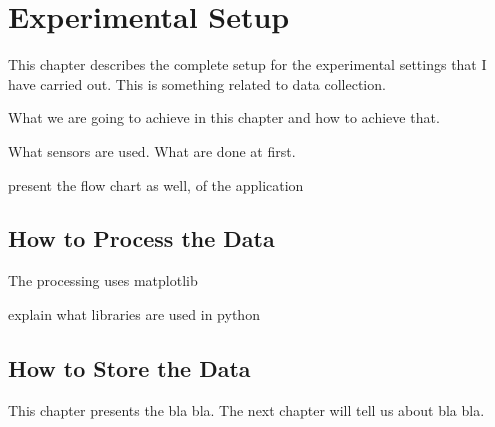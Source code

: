 \chapter{Experimental Setup}
\label{ch:experimental-setup} %
This chapter describes the complete setup for the experimental settings that I have carried out. This is something related to data collection.

What we are going to achieve in this chapter and how to achieve that.

What sensors are used.
What are done at first.

present the flow chart as well, of the application


\section{How to Process the Data} %
\label{sec:how_to_process_the_data}
The processing uses matplotlib\cite{Hunter:2007}


explain what libraries are used in python

\section{How to Store the Data} %
\label{sec:how_to_store_the_data}


This chapter presents the bla bla. The next chapter will tell us about bla bla.
